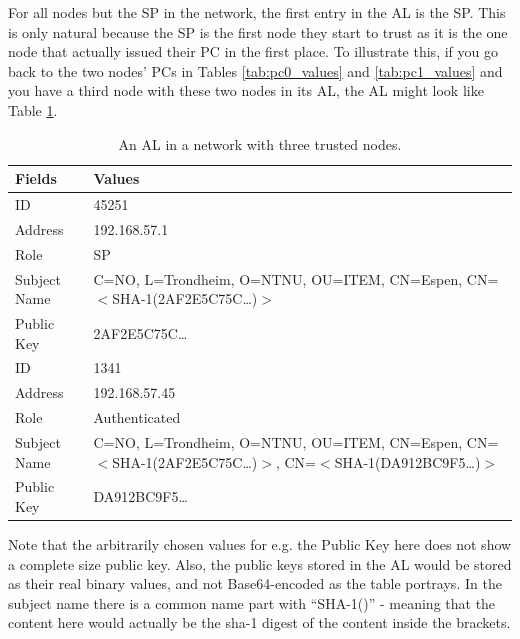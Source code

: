 For all nodes but the \ac{SP} in the network, the first entry in the \ac{AL} is
the \ac{SP}. This is only natural because the \ac{SP} is the first node they
start to trust as it is the one node that actually issued their \ac{PC} in the
first place. To illustrate this, if you go back to the two nodes' \acp{PC} in
Tables \ref{tab:pc0_values} and \ref{tab:pc1_values} and you have a third node
with these two nodes in its \ac{AL}, the \ac{AL} might look like Table
\ref{tab:al_content_3_nodes}.
\begin{table}[h]
	\centering
	\begin{tabularx}{\linewidth}{| l | X |}\hline
 		\textbf{Fields} & \textbf{Values}\\\hline
 		\hline
		ID & 45251\\\hline
		Address & 192.168.57.1\\\hline
		Role & SP\\\hline 
		Subject Name & C=NO, L=Trondheim, O=NTNU, OU=ITEM, CN=Espen, CN=$<$SHA-1(2AF2E5C75C\ldots)$>$\\\hline
		Public Key & 2AF2E5C75C\ldots\\\hline
		\hline
		ID & 1341\\\hline
		Address & 192.168.57.45\\\hline
		Role & Authenticated\\\hline 
		Subject Name & C=NO, L=Trondheim, O=NTNU, OU=ITEM, CN=Espen, CN=$<$SHA-1(2AF2E5C75C\ldots)$>$, CN=$<$SHA-1(DA912BC9F5\ldots)$>$\\\hline
		Public Key & DA912BC9F5\ldots\\\hline  
	\end{tabularx}
	\caption{An \acf{AL} in a network with three trusted nodes.}
	\label{tab:al_content_3_nodes}
\end{table}
Note that the arbitrarily chosen values for e.g. the Public Key here does not
show a complete size public key. Also, the public keys stored in the \ac{AL}
would be stored as their real binary values, and not Base64-encoded as the table
portrays. In the subject name there is a common name part with ``SHA-1()'' -
meaning that the content here would actually be the sha-1 digest of the content
inside the brackets.


